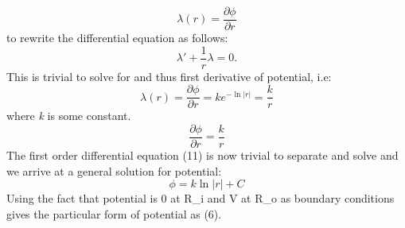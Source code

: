 \documentclass{article}
\begin{document}
\begin{equation}
\lambda(r) = \frac{\partial\phi}{\partial r}
\label{10}
\end{equation}
to rewrite the differential equation as follows: 
\begin{equation}
\lambda ' + \frac{1}{r}\lambda = 0.
\label{11}
\end{equation}
This is trivial to solve for \lambda\) and thus first derivative of potential,  i.e:
\begin{equation}
\lambda(r) =  \frac{\partial\phi}{\partial r} = ke^{-\ln|r|} = \frac{k}{r}
\label{11}
\end{equation}
where \textit{k} is some constant.
\begin{equation}
 \frac{\partial\phi}{\partial r} = \frac{k}{r}
\label{11}
\end{equation}
The first order differential equation (11) is now trivial to separate and solve and we arrive at a general solution for potential:
\begin{equation}
\phi = k\ln|r| + C
\label{11}
\end{equation}
Using the fact that potential is 0 at R_i\) and V at R_o\) as boundary conditions gives the particular form of potential as (6). \\







\end{document}
